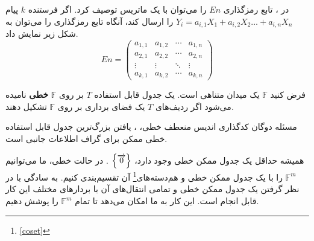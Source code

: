\begin{note}
    در 
    \lpicod
    ، تابع رمزگذاری 
    $En$
         را می‌توان با یک ماتریس توصیف کرد. اگر فرستنده
    $k$ 
    پیام
     $Y_i = a_{i,1} X_1 + a_{i,2} X_2 \ldots + a_{i,n} X_n$
      را ارسال کند، آنگاه تابع رمزگذاری را می‌توان به شکل زیر نمایش داد.
    \begin{equation*}
        En =
        \begin{pmatrix}
            a_{1,1} & a_{1,2} & \cdots & a_{1,n} \\
            a_{2,1} & a_{2,2} & \cdots & a_{2,n} \\
            \vdots  & \vdots  & \ddots & \vdots  \\
            a_{k,1} & a_{k,2} & \cdots & a_{k,n}
        \end{pmatrix}
    \end{equation*}
\end{note}

\begin{definition}
	\label{def:lineartable}
    فرض کنید 
    $\mathbb{F}$
     یک میدان متناهی است. یک جدول قابل استفاده 
     $T$ 
     بر روی 
     $\mathbb{F}$
      \textbf{
      خطی
    }
       نامیده می‌شود اگر ردیف‌های 
      $T$ 
      یک فضای برداری بر روی 
      $\mathbb{F}$
       تشکیل دهند.
\end{definition}

مسئله دوگان کدگذاری اندیس منعطف خطی، 
\lpsicod
، یافتن بزرگ‌ترین جدول قابل استفاده خطی ممکن برای گراف اطلاعات جانبی است.

\begin{remark}
    همیشه حداقل یک جدول ممکن خطی وجود دارد، 
    $\left\{ \overrightarrow{0} \right\}$
    . در حالت خطی، ما می‌توانیم 
    $\mathbb{F}^m$
     را با یک جدول ممکن خطی و هم‌دسته‌های\footnote{\autoref{coset}} آن تقسیم‌بندی کنیم. به سادگی با در نظر گرفتن یک جدول ممکن خطی و تمامی انتقال‌های  آن با بردارهای مختلف این کار قابل انجام است. این کار به ما امکان می‌دهد تا تمام 
     $\mathbb{F}^m$
      را پوشش دهیم.
\end{remark}

